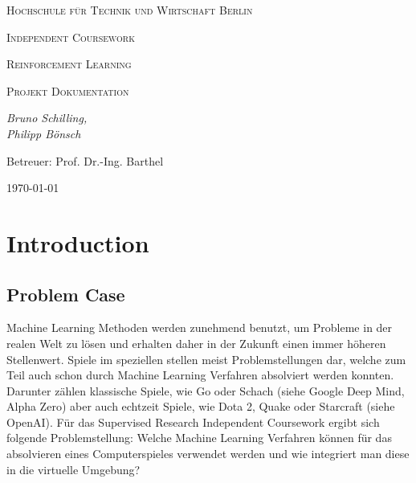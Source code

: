 \documentclass[11pt]{scrartcl}
\begin{document}
\begin{titlepage}
	\centering
	{\scshape\LARGE Hochschule für Technik und Wirtschaft Berlin \par}
	\vspace{2cm}
	{\Huge \scshape{Independent Coursework}\par}
	\vspace{2cm}
	{\LARGE \scshape{Reinforcement Learning}\par}
	{\scshape\Large Projekt Dokumentation\par}
	\vspace{4cm}
	{\large\itshape Bruno Schilling,\\Philipp Bönsch\par}
	\vfill
	
	{\large Betreuer: Prof. Dr.-Ing. Barthel \par}
	\vspace{1cm}
	{\large \today\par}
\end{titlepage}

\lstset{basicstyle=\ttfamily\small,breaklines=true}
\newpage
\tableofcontents
\newpage
\section{Introduction}

\subsection{Problem Case}
Machine Learning Methoden werden zunehmend benutzt, um Probleme in der realen Welt zu lösen und erhalten daher in der Zukunft einen immer höheren Stellenwert. Spiele im speziellen stellen meist Problemstellungen dar, welche zum Teil auch schon durch Machine Learning Verfahren absolviert werden konnten. Darunter zählen klassische Spiele, wie Go oder Schach (siehe Google Deep Mind, Alpha Zero) aber auch echtzeit Spiele, wie Dota 2, Quake oder Starcraft (siehe OpenAI). Für das Supervised Research Independent Coursework ergibt sich folgende Problemstellung: Welche Machine Learning Verfahren können für das absolvieren eines Computerspieles verwendet werden und wie integriert man
diese in die virtuelle Umgebung? 
\end{document}
